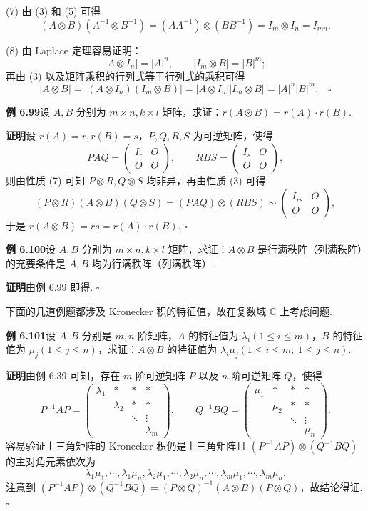 \documentclass[UTF8, 12pt, fontset=fandol, oneside]{ctexart}
\begin{document}
(7) 由 (3) 和 (5) 可得
\[
(A\otimes B)(A^{-1}\otimes B^{-1})=(AA^{-1})\otimes(BB^{-1})=I_m\otimes I_n=I_{mn}.
\]

(8) 由 Laplace 定理容易证明：
\[
|A\otimes I_n|=|A|^n,\qquad |I_m\otimes B|=|B|^m;
\]
再由 (3) 以及矩阵乘积的行列式等于行列式的乘积可得
\[
|A\otimes B|=|(A\otimes I_n)(I_m\otimes B)|=|A\otimes I_n||I_m\otimes B|=|A|^n|B|^m. \quad \square
\]

\noindent\textbf{例 6.99}\quad 设 $A,B$ 分别为 $m\times n,k\times l$ 矩阵，求证：$r(A\otimes B)=r(A)\cdot r(B)$.

\noindent\textbf{证明}\quad 设 $r(A)=r,r(B)=s$，$P,Q,R,S$ 为可逆矩阵，使得
\[
PAQ=\begin{pmatrix} I_r&O\\ O&O\end{pmatrix},\qquad
RBS=\begin{pmatrix} I_s&O\\ O&O\end{pmatrix},
\]
则由性质 (7) 可知 $P\otimes R,Q\otimes S$ 均非异，再由性质 (3) 可得
\[
(P\otimes R)(A\otimes B)(Q\otimes S)=(PAQ)\otimes(RBS)\sim
\begin{pmatrix} I_{rs}&O\\ O&O\end{pmatrix},
\]
于是 $r(A\otimes B)=rs=r(A)\cdot r(B)$. $\square$

\noindent\textbf{例 6.100}\quad 设 $A,B$ 分别为 $m\times n,k\times l$ 矩阵，求证：$A\otimes B$ 是行满秩阵（列满秩阵）的充要条件是 $A,B$ 均为行满秩阵（列满秩阵）.

\noindent\textbf{证明}\quad 由例 6.99 即得. $\square$

下面的几道例题都涉及 Kronecker 积的特征值，故在复数域 $\mathbb{C}$ 上考虑问题.

\noindent\textbf{例 6.101}\quad 设 $A,B$ 分别是 $m,n$ 阶矩阵，$A$ 的特征值为 $\lambda_i(1\le i\le m)$，$B$ 的特征值为 $\mu_j(1\le j\le n)$，求证：$A\otimes B$ 的特征值为 $\lambda_i\mu_j(1\le i\le m;\ 1\le j\le n)$.

\noindent\textbf{证明}\quad 由例 6.39 可知，存在 $m$ 阶可逆矩阵 $P$ 以及 $n$ 阶可逆矩阵 $Q$，使得
\[
P^{-1}AP=
\begin{pmatrix}
\lambda_1&*&*&*\\
&\lambda_2&*&*\\
&&\ddots&\vdots\\
&&&\lambda_m
\end{pmatrix},\qquad
Q^{-1}BQ=
\begin{pmatrix}
\mu_1&*&*&*\\
&\mu_2&*&*\\
&&\ddots&\vdots\\
&&&\mu_n
\end{pmatrix}.
\]
容易验证上三角矩阵的 Kronecker 积仍是上三角矩阵且 $(P^{-1}AP)\otimes(Q^{-1}BQ)$ 的主对角元素依次为
\[
\lambda_1\mu_1,\cdots,\lambda_1\mu_n,\lambda_2\mu_1,\cdots,\lambda_2\mu_n,\cdots,\lambda_m\mu_1,\cdots,\lambda_m\mu_n.
\]
注意到 $(P^{-1}AP)\otimes(Q^{-1}BQ)=(P\otimes Q)^{-1}(A\otimes B)(P\otimes Q)$，故结论得证. $\square$
\end{document}
